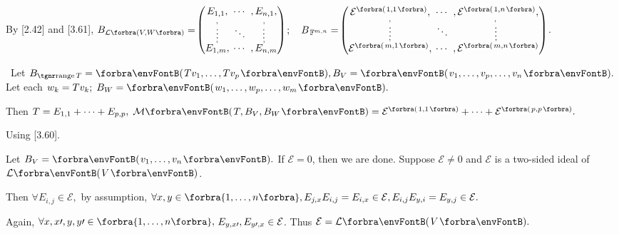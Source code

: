 By [2.42] and [3.61], \;$B_{\Lm[\SmallPar]{V,W}}=${\normalsize${\begin{pmatrix} \underset{\;,}{E_{1,1}}, &\hspace{-6pt} \cdots &\hspace{-6pt} ,\underset{\!,}{E_{n,1}},\\[-2pt] \vdots &\hspace{-6pt} \ddots &\hspace{-6pt} \vdots\\[-2pt] \overset{\;,}{E_{1,m}}, &\hspace{-6pt} \cdots &\hspace{-6pt} ,\overset{\!\!\!,}{E_{n,m}}\end{pmatrix}}$}$;\quad B_{\,{\mathbb{F}}^{m,n}}=${\normalsize$\envFontSmall[\scriptsize]{\begin{pmatrix} \underset{\;,}{\mathcal{E}^{\Par{1,1}}}, &\hspace{-6pt} \cdots &\hspace{-6pt} ,\underset{\!\!,}{\mathcal{E}^{\Par{1,n}}},\\[-2pt] \vdots &\hspace{-6pt} \ddots &\hspace{-6pt} \vdots\\[-2pt]\overset{\;,}{\mathcal{E}^{\Par{m,1}}}, &\hspace{-6pt} \cdots &\hspace{-6pt} ,\overset{\!\!\!,}{\mathcal{E}^{\Par{m,n}}}\end{pmatrix}}$}.\par\vspace{6pt}
\Tips \,\,\,Let $B_{\range T}=\Par{Tv_1,\dots,Tv_p},B_V=\Par{v_1,\dots,v_p,\dots,v_n}.$ Let each $w_k=Tv_k;\;B_W=\Par{w_1,\dots,w_p,\dots,w_m}.$\par\vspace{2pt}\IndentTips
Then $T=E_{1,1}+\dots+E_{p,p},\;\Mt{T,B_V,B_W}=\mathcal{E}^{\SmallPar[1pt]{1,1}}+\dots+\mathcal{E}^{\SmallPar[1pt]{p,p}}.$\vspace{-4pt}
\SepLine

 \;Using {\NOTEFOR} [3.60].\par\quad
Let $B_V=\Par{v_1,\dots,v_n}.$ If $\mathcal{E}=0$, then we are done. Suppose $\mathcal{E}\neq 0$ and $\mathcal{E}$ is a two-sided ideal of $\Lm{V}$.\vspace{3pt}\par\quad
Then {\Large\envFontLarge$\forall E_{i,j}\in\mathcal{E},$} by assumption, {\Large\envFontLarge\vspace{3pt}$\forall x,y\in\Bra{1,\dots,n},E_{j,x}E_{i,j}=E_{i,x}\in\mathcal{E},E_{i,j}E_{y,i}=E_{y,j}\in\mathcal{E}.$}\par\quad
Again, $\forall x,x\apostrophe,y,y\apostrophe\in\Bra{1,\dots,n},$\;\,{\Large\envFontLarge$E_{y,x\prime},E_{y\prime,x}\in\mathcal{E}$}. Thus $\mathcal{E}=\Lm{V}.$\PfEnd
\SepLine

